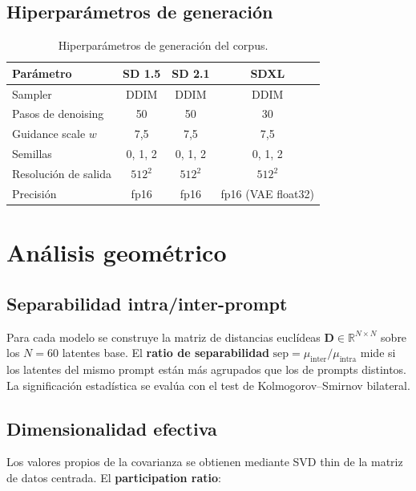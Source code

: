 \documentclass[12pt, a4paper, twoside]{book}
\newcommand{\R}{\mathbb{R}}
\begin{document}
\subsection{Hiperparámetros de generación}

\begin{table}[htb]
\centering
\caption{Hiperparámetros de generación del corpus.}
\label{tab:hiper_generacion}
\small
\begin{tabular}{lccc}
\toprule
\textbf{Parámetro} & \textbf{SD 1.5} & \textbf{SD 2.1} & \textbf{SDXL} \\
\midrule
Sampler & DDIM & DDIM & DDIM \\
Pasos de denoising & 50 & 50 & 30 \\
Guidance scale $w$ & 7,5 & 7,5 & 7,5 \\
Semillas & 0, 1, 2 & 0, 1, 2 & 0, 1, 2 \\
Resolución de salida & $512^2$ & $512^2$ & $512^2$ \\
Precisión & fp16 & fp16 & fp16 (VAE float32) \\
\bottomrule
\end{tabular}
\end{table}

\section{Análisis geométrico}
\label{sec:metodos:geometrico}

\subsection{Separabilidad intra/inter-prompt}

Para cada modelo se construye la matriz de distancias euclídeas $\mathbf{D} \in \R^{N \times N}$ sobre los $N = 60$ latentes base. El \textbf{ratio de separabilidad} $\text{sep} = \mu_{\text{inter}} / \mu_{\text{intra}}$ mide si los latentes del mismo prompt están más agrupados que los de prompts distintos. La significación estadística se evalúa con el test de Kolmogorov--Smirnov bilateral.

\subsection{Dimensionalidad efectiva}

Los valores propios de la covarianza se obtienen mediante SVD thin de la matriz de datos centrada. El \textbf{participation ratio}:
\end{document}
